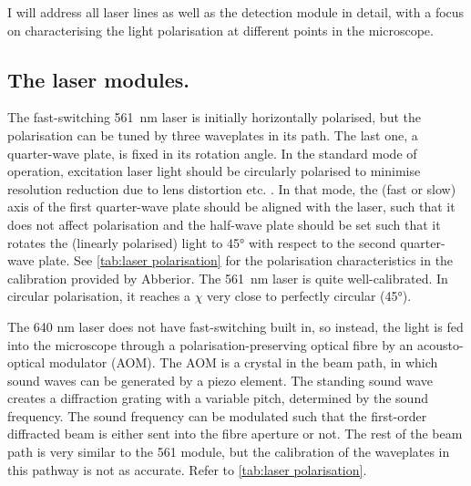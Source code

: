 I will address all laser lines as well as the detection module in detail, with a focus on characterising the light polarisation at different points in the microscope.

\subsection{The laser modules.} The fast-switching 561~nm laser is initially horizontally polarised, but the polarisation can be tuned by three waveplates in its path. The last one, a quarter-wave plate, is fixed in its rotation angle. In the standard mode of operation, excitation laser light should be circularly polarised to minimise resolution reduction due to lens distortion etc. \cite{Harke2008}. In that mode, the (fast or slow) axis of the first quarter-wave plate should be aligned with the laser, such that it does not affect polarisation and the half-wave plate should be set such that it rotates the (linearly polarised) light to \ang{45} with respect to the second quarter-wave plate. See \autoref{tab:laser polarisation} for the polarisation characteristics in the calibration provided by Abberior. The 561~nm laser is quite well-calibrated. In circular polarisation, it reaches a $ \chi $ very close to perfectly circular (\ang{45}).

The 640 nm laser does not have fast-switching built in, so instead, the light is fed into the microscope through a polarisation-preserving optical fibre by an acousto-optical modulator (AOM). The AOM is a crystal in the beam path, in which sound waves can be generated by a piezo element. The standing sound wave creates a diffraction grating with a variable pitch, determined by the sound frequency. The sound frequency can be modulated such that the first-order diffracted beam is either sent into the fibre aperture or not. The rest of the beam path is very similar to the 561 module, but the calibration of the waveplates in this pathway is not as accurate. Refer to \autoref{tab:laser polarisation}. 

